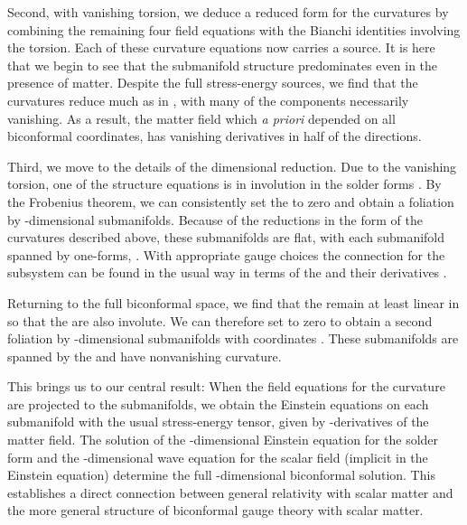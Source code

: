\documentclass[a4paper,a4paper]{article}
\begin{document}
\smallskip

Second, with vanishing torsion, we deduce a reduced form for the curvatures
by combining the remaining four field equations with the Bianchi identities
involving the torsion. Each of these curvature equations now carries a
source. It is here that we begin to see that the submanifold structure
predominates even in the presence of matter. Despite the full stress-energy
sources, we find that the curvatures reduce much as in \cite{WW}, with many of
the components necessarily vanishing. As a result, the matter field \myHighlight{$\phi ,$}\coordHE{}
which \textit{a priori }depended on all \coordHE{} biconformal coordinates, has
vanishing derivatives in half of the \coordHE{} directions.

\smallskip

Third, we move to the details of the dimensional reduction. Due to the
vanishing torsion, one of the structure equations is in involution in the \coordHE{}
solder forms \coordHE{}. By the Frobenius theorem, we can consistently
set the \coordHE{} to zero and obtain a foliation by \coordHE{}-dimensional
submanifolds. Because of the reductions in the form of the curvatures
described above, these submanifolds are flat, with each submanifold spanned
by \coordHE{} one-forms, \coordHE{}. With appropriate gauge choices the
connection for the subsystem can be found in the usual way in terms of the \coordHE{} and their derivatives \coordHE{}.

Returning to the full biconformal space, we find that the \coordHE{}
remain at least linear in \coordHE{} so that the \coordHE{} are
also involute. We can therefore set \coordHE{} to zero to obtain a
second foliation by \coordHE{}-dimensional submanifolds with coordinates \coordHE{}%
. These submanifolds are spanned by the \coordHE{} and have
nonvanishing curvature.

This brings us to our central result: When the field equations for the
curvature are projected to the \coordHE{} submanifolds, we obtain
the Einstein equations on each submanifold with the usual stress-energy
tensor, given by \coordHE{}-derivatives of the matter field. The solution of the \coordHE{}%
-dimensional Einstein equation for the solder form and the \coordHE{}-dimensional
wave equation for the scalar field (implicit in the Einstein equation)
determine the full \coordHE{}-dimensional biconformal solution. This establishes a
direct connection between general relativity with scalar matter and the more
general structure of biconformal gauge theory with scalar matter.
\end{document}
